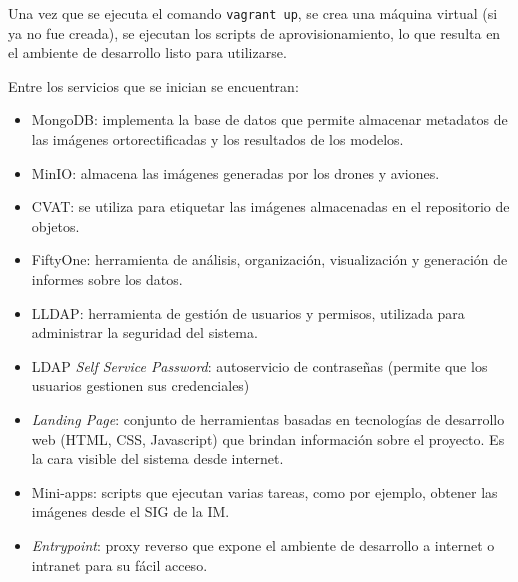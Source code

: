 Una vez que se ejecuta el comando \lstinline[language=sh]|vagrant up|, se crea una máquina virtual (si ya no fue creada), se ejecutan los scripts de aprovisionamiento, lo que resulta en el ambiente de desarrollo listo para utilizarse.

Entre los servicios que se inician se encuentran:

\begin{itemize}
  \item MongoDB: implementa la base de datos que permite almacenar metadatos de las imágenes ortorectificadas y los resultados de los modelos.
  \item MinIO: almacena las imágenes generadas por los drones y aviones.
  \item CVAT: se utiliza para etiquetar las imágenes almacenadas en el repositorio de objetos.
  \item FiftyOne: herramienta de análisis, organización, visualización y generación de informes sobre los datos.
  \item LLDAP: herramienta de gestión de usuarios y permisos, utilizada para administrar la seguridad del sistema.
  \item LDAP \textit{Self Service Password}: autoservicio de contraseñas (permite que los usuarios gestionen sus credenciales)
  \item \textit{Landing Page}: conjunto de herramientas basadas en tecnologías de desarrollo web (HTML, CSS, Javascript) que brindan información sobre el proyecto. Es la cara visible del sistema desde internet.
  \item Mini-apps: scripts que ejecutan varias tareas, como por ejemplo, obtener las imágenes desde el SIG de la IM.
  \item \textit{Entrypoint}: proxy reverso que expone el ambiente de desarrollo a internet o intranet para su fácil acceso.
\end{itemize}



